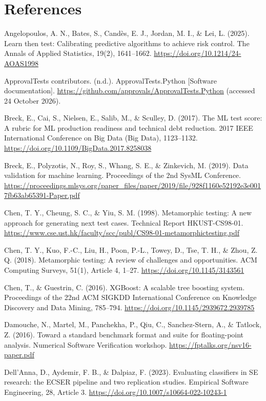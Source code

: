 \documentclass[11pt,a4paper]{article}
\begin{document}
\section*{References}
Angelopoulos, A. N., Bates, S., Candès, E. J., Jordan, M. I., \& Lei, L. (2025). Learn then test: Calibrating predictive algorithms to achieve risk control. The Annals of Applied Statistics, 19(2), 1641--1662. \url{https://doi.org/10.1214/24-AOAS1998}

ApprovalTests contributors. (n.d.). ApprovalTests.Python [Software documentation]. \url{https://github.com/approvals/ApprovalTests.Python} (accessed 24 October 2026).

Breck, E., Cai, S., Nielsen, E., Salib, M., \& Sculley, D. (2017). The ML test score: A rubric for ML production readiness and technical debt reduction. 2017 IEEE International Conference on Big Data (Big Data), 1123--1132. \url{https://doi.org/10.1109/BigData.2017.8258038}

Breck, E., Polyzotis, N., Roy, S., Whang, S. E., \& Zinkevich, M. (2019). Data validation for machine learning. Proceedings of the 2nd SysML Conference. \url{https://proceedings.mlsys.org/paper_files/paper/2019/file/928f1160e52192e3e0017fb63ab65391-Paper.pdf}

Chen, T. Y., Cheung, S. C., \& Yiu, S. M. (1998). Metamorphic testing: A new approach for generating next test cases. Technical Report HKUST-CS98-01. \url{https://www.cse.ust.hk/faculty/scc/publ/CS98-01-metamorphictesting.pdf}

Chen, T. Y., Kuo, F.-C., Liu, H., Poon, P.-L., Towey, D., Tse, T. H., \& Zhou, Z. Q. (2018). Metamorphic testing: A review of challenges and opportunities. ACM Computing Surveys, 51(1), Article 4, 1--27. \url{https://doi.org/10.1145/3143561}

Chen, T., \& Guestrin, C. (2016). XGBoost: A scalable tree boosting system. Proceedings of the 22nd ACM SIGKDD International Conference on Knowledge Discovery and Data Mining, 785--794. \url{https://doi.org/10.1145/2939672.2939785}

Damouche, N., Martel, M., Panchekha, P., Qiu, C., Sanchez-Stern, A., \& Tatlock, Z. (2016). Toward a standard benchmark format and suite for floating-point analysis. Numerical Software Verification workshop. \url{https://fptalks.org/nsv16-paper.pdf}

Dell'Anna, D., Aydemir, F. B., \& Dalpiaz, F. (2023). Evaluating classifiers in SE research: the ECSER pipeline and two replication studies. Empirical Software Engineering, 28, Article 3. \url{https://doi.org/10.1007/s10664-022-10243-1}
\end{document}
